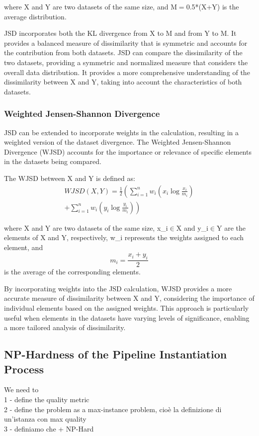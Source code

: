 where X and Y are two datasets of the same size, and M$=$0.5*(X+Y) is the average distribution.

JSD incorporates both the KL divergence from X to M and from Y to M. It provides a balanced measure of dissimilarity that is symmetric and accounts for the contribution from both datasets.
%
JSD can compare the dissimilarity of the two datasets, providing a symmetric and normalized measure that considers the overall data distribution.
%
It provides a more comprehensive understanding of the dissimilarity between X and Y, taking into account the characteristics of both datasets.

\subsubsection{Weighted Jensen-Shannon Divergence}
JSD can be extended to incorporate weights in the calculation, resulting in a weighted version of the dataset divergence. The Weighted Jensen-Shannon Divergence (WJSD) accounts for the importance or relevance of specific elements in the datasets being compared.

The WJSD between X and Y is defined as:
\begin{align*}
  WJSD(X, Y) = \frac{1}{2} \left( \sum_{i=1}^{n} w_i \left( x_i \log \frac{x_i}{m_i} \right) \right. \\
  \left. + \sum_{i=1}^{n} w_i \left( y_i \log \frac{y_i}{m_i} \right) \right)
\end{align*}

where X and Y are two datasets of the same size, x\_i$\in$X and y\_i$\in$Y are the elements of X and Y, respectively, w\_i represents the weights assigned to each element, and \[m_i = \frac{{x_i + y_i}}{2}\] is the average of the corresponding elements.

By incorporating weights into the JSD calculation, WJSD provides a more accurate measure of dissimilarity between X and Y, considering the importance of individual elements based on the assigned weights. This approach is particularly useful when elements in the datasets have varying levels of significance, enabling a more tailored analysis of dissimilarity.

\subsection{NP-Hardness of the Pipeline Instantiation Process}\label{sec:nphard}
We need to\\
1 - define the quality metric\\
2 - define the problem as a max-instance problem, cioè la definizione di un'istanza con max quality\\
3 - definiamo che + NP-Hard

